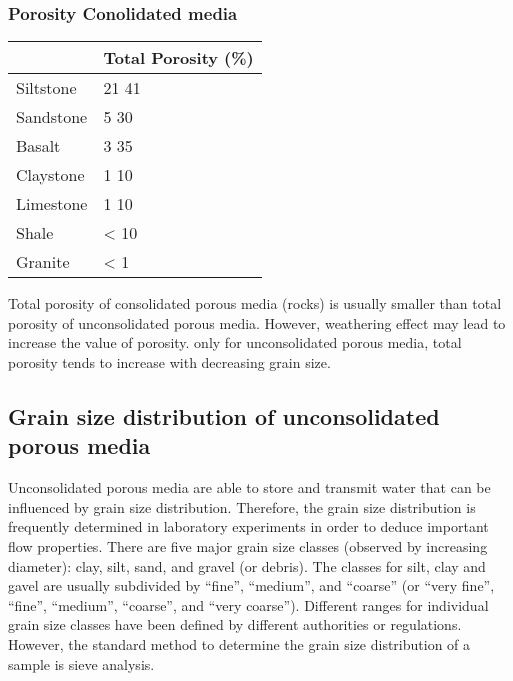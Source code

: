 \documentclass[letterpaper,10pt,english]{sphinxmanual}
\begin{document}
\subsubsection*{Porosity \sphinxhyphen{} Conolidated media}


\begin{savenotes}\sphinxattablestart
\centering
\begin{tabulary}{\linewidth}[t]{|T|T|}
\hline


&\sphinxstyletheadfamily 
Total  Porosity (\%)
\\
\hline
Siltstone
&
21 \sphinxhyphen{} 41
\\
\hline
Sandstone
&
5 \sphinxhyphen{} 30
\\
\hline
Basalt
&
3 \sphinxhyphen{} 35
\\
\hline
Claystone
&
1 \sphinxhyphen{} 10
\\
\hline
Limestone
&
1 \sphinxhyphen{} 10
\\
\hline
Shale
&
\textless{} 10
\\
\hline
Granite
&
\textless{} 1
\\
\hline
\end{tabulary}
\par
\sphinxattableend\end{savenotes}

Total porosity of consolidated porous media (rocks) is usually smaller than total porosity of unconsolidated porous media. However, weathering effect may lead to increase the value of porosity.
only for unconsolidated porous media, total porosity tends to increase with decreasing grain size.


\subsection{Grain size distribution of unconsolidated porous media}
\label{\detokenize{contents/flow/lecture_02/12_subsurface_structure:grain-size-distribution-of-unconsolidated-porous-media}}
Unconsolidated porous media are able to store and transmit water that can be influenced by grain size distribution. Therefore, the grain size distribution is frequently determined in laboratory experiments in order to deduce important flow properties.
There are five major grain size classes (observed by increasing diameter): clay, silt, sand, and gravel (or debris). The classes for silt, clay and gavel are usually subdivided by “fine”, “medium”, and “coarse” (or “very fine”, “fine”, “medium”, “coarse”, and “very coarse”). Different ranges for individual grain size classes have been defined by different authorities or regulations. However, the standard method to determine the grain size distribution of a sample is sieve analysis.
\end{document}
